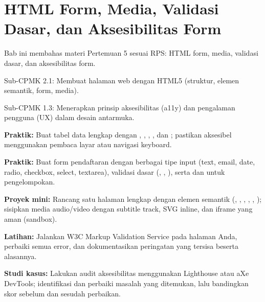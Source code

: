 \documentclass[../main.tex]{subfiles}
\begin{document}
\chapter{HTML Form, Media, Validasi Dasar, dan Aksesibilitas Form}

Bab ini membahas materi Pertemuan 5 sesuai RPS: HTML form, media, validasi dasar, dan aksesibilitas form.

\begin{subcpmk}
  \item Sub-CPMK 2.1: Membuat halaman web dengan HTML5 (struktur, elemen semantik, form, media).
  \item Sub-CPMK 1.3: Menerapkan prinsip aksesibilitas (a11y) dan pengalaman pengguna (UX) dalam desain antarmuka.
\end{subcpmk}















\begin{aktivitas}
  \item \textbf{Praktik:} Buat tabel data lengkap dengan , , , , dan ; pastikan aksesibel menggunakan pembaca layar atau navigasi keyboard.
  \item \textbf{Praktik:} Buat form pendaftaran dengan berbagai tipe input (text, email, date, radio, checkbox, select, textarea), validasi dasar (, , ), serta  dan  untuk pengelompokan.
  \item \textbf{Proyek mini:} Rancang satu halaman lengkap dengan elemen semantik (, , , , , ); sisipkan media audio/video dengan subtitle track, SVG inline, dan iframe yang aman (sandbox).
  \item \textbf{Latihan:} Jalankan W3C Markup Validation Service pada halaman Anda, perbaiki semua error, dan dokumentasikan peringatan yang tersisa beserta alasannya.
  \item \textbf{Studi kasus:} Lakukan audit aksesibilitas menggunakan Lighthouse atau aXe DevTools; identifikasi dan perbaiki masalah yang ditemukan, lalu bandingkan skor sebelum dan sesudah perbaikan.
\end{aktivitas}
\end{document}
